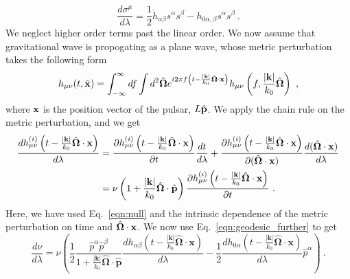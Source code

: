 \documentclass[prd,aps,psfig,nofootinbib,nobibnotes,superscriptaddress,preprintnumbers,times]{revtex4-2}\setlength{\topmargin}{-14mm}
\begin{document}
\begin{equation}\label{eqn:geodesic_further}
    \frac{d\sigma^\mu}{d\lambda} = \frac{1}{2}\dot{h}_{\alpha \beta} s^\alpha s^\beta - h_{0\alpha, \beta} s^\alpha s^\beta \ .
\end{equation}
We neglect higher order terms past the linear order. We now assume that gravitational wave is propogating as a plane wave, whose metric perturbation takes the following form 
\begin{equation}\label{eqn:plane_wave}
    h_{\mu \nu}(t, \hat{\bf x}) = \int_{-\infty}^\infty df \int d^2 \hat{\bf \Omega} e^{i2\pi f \left(t - \frac{|{\bf k}|}{k_0} \hat{\bf \Omega}\cdot {\bf x}\right)}h_{\mu \nu}\left(f, \frac{|{\bf k}|}{k_0} \hat{\bf \Omega} \right) \ ,
\end{equation}
where ${\bf x}$ is the position vector of the pulsar, $L\hat{\bf p}$. We apply the chain rule on the metric perturbation, and we get
\begin{equation}\label{eqn:dhdlambda}
    \begin{aligned}
        \frac{dh^{(i)}_{\mu \nu} \left(t - \frac{|{\bf k}|}{k_0} \hat{\bf \Omega}\cdot {\bf x}\right) }{d\lambda } &= \frac{\partial h^{(i)}_{\mu \nu}\left(t - \frac{|{\bf k}|}{k_0} \hat{\bf \Omega}\cdot {\bf x}\right) }{\partial t} \frac{dt}{d \lambda} + \frac{\partial h^{(i)}_{\mu \nu}\left(t - \frac{|{\bf k}|}{k_0} \hat{\bf \Omega}\cdot {\bf x}\right) }{\partial (\hat{\bf \Omega}\cdot {\bf x})} \frac{d(\hat{\bf \Omega}\cdot {\bf x})}{d \lambda} \\ &= \nu\left( 1 + \frac{|{\bf k}|}{k_0} \hat{\bf \Omega}\cdot \hat{\bf p}\right) \frac{\partial h^{(i)}_{\mu \nu}\left(t - \frac{|{\bf k}|}{k_0} \hat{\bf \Omega}\cdot {\bf x}\right) }{\partial t} \ .
    \end{aligned}
\end{equation}
Here, we have used Eq.\ \ref{eqn:null} and the intrinsic dependence of the metric perturbation on time and $\hat{\bf \Omega}\cdot {\bf x}$. We now use Eq.\ \ref{eqn:geodesic_further} to get 
\begin{equation}\label{eqn:dnudl}
    \frac{d\nu}{d\lambda} = \nu \left( \frac{1}{2} \frac{\hat{p}^\alpha \hat{p}^\beta}{1+\frac{|\boldsymbol{k}|}{k_0} \hat{\boldsymbol{\Omega}} \cdot \hat{\boldsymbol{p}}}\frac{d h_{\alpha \beta}\left(t - \frac{|\boldsymbol{k}|}{k_0} \hat{\boldsymbol{\Omega}} \cdot {\boldsymbol{x}}\right)}{d \lambda} - \frac{1}{2} \frac{dh_{0\alpha}\left(t - \frac{|\boldsymbol{k}|}{k_0} \hat{\boldsymbol{\Omega}} \cdot {\boldsymbol{x}}\right)}{d\lambda}\hat{p}^\alpha \right) \ .
\end{equation}
\end{document}
